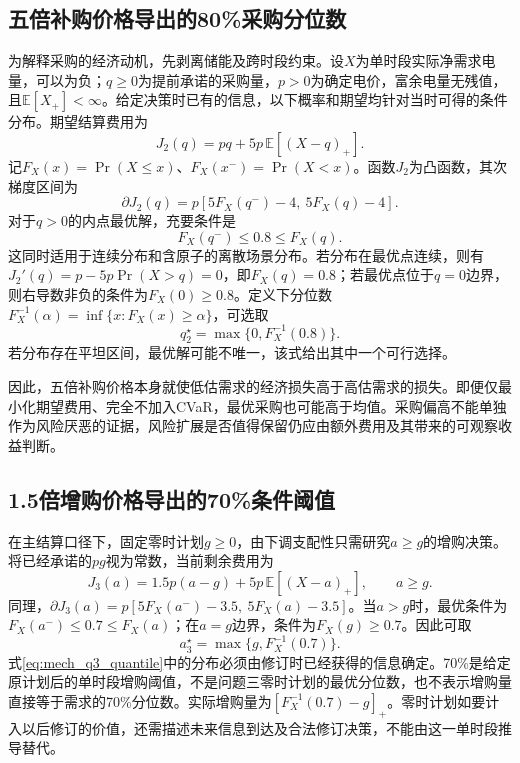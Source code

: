 \subsection{五倍补购价格导出的80\%采购分位数}

为解释采购的经济动机，先剥离储能及跨时段约束。设$X$为单时段实际净需求电量，可以为负；$q\ge0$为提前承诺的采购量，$p>0$为确定电价，富余电量无残值，且$\mathbb E[X_+]<\infty$。给定决策时已有的信息，以下概率和期望均针对当时可得的条件分布。期望结算费用为
\begin{equation}
 J_2(q)=pq+5p\,\mathbb E[(X-q)_+].
 \label{eq:mech_q2_cost}
\end{equation}
记$F_X(x)=\Pr(X\le x)$、$F_X(x^-)=\Pr(X<x)$。函数$J_2$为凸函数，其次梯度区间为
\begin{equation}
 \partial J_2(q)=p[5F_X(q^-)-4,\ 5F_X(q)-4].
 \label{eq:mech_q2_subgradient}
\end{equation}
对于$q>0$的内点最优解，充要条件是
\begin{equation}
 F_X(q^-)\le0.8\le F_X(q).
 \label{eq:mech_q2_quantile_condition}
\end{equation}
这同时适用于连续分布和含原子的离散场景分布。若分布在最优点连续，则有$J_2'(q)=p-5p\Pr(X>q)=0$，即$F_X(q)=0.8$；若最优点位于$q=0$边界，则右导数非负的条件为$F_X(0)\ge0.8$。定义下分位数$F_X^{-1}(\alpha)=\inf\{x:F_X(x)\ge\alpha\}$，可选取
\begin{equation}
 q_2^\star=\max\{0,F_X^{-1}(0.8)\}.
 \label{eq:mech_q2_quantile}
\end{equation}
若分布存在平坦区间，最优解可能不唯一，该式给出其中一个可行选择。

因此，五倍补购价格本身就使低估需求的经济损失高于高估需求的损失。即便仅最小化期望费用、完全不加入CVaR，最优采购也可能高于均值。采购偏高不能单独作为风险厌恶的证据，风险扩展是否值得保留仍应由额外费用及其带来的可观察收益判断。

\subsection{1.5倍增购价格导出的70\%条件阈值}

在主结算口径下，固定零时计划$g\ge0$，由下调支配性只需研究$a\ge g$的增购决策。将已经承诺的$pg$视为常数，当前剩余费用为
\begin{equation}
 J_3(a)=1.5p(a-g)+5p\,\mathbb E[(X-a)_+],\qquad a\ge g.
 \label{eq:mech_q3_cost}
\end{equation}
同理，$\partial J_3(a)=p[5F_X(a^-)-3.5,\ 5F_X(a)-3.5]$。当$a>g$时，最优条件为$F_X(a^-)\le0.7\le F_X(a)$；在$a=g$边界，条件为$F_X(g)\ge0.7$。因此可取
\begin{equation}
 a_3^\star=\max\{g,F_X^{-1}(0.7)\}.
 \label{eq:mech_q3_quantile}
\end{equation}
式\eqref{eq:mech_q3_quantile}中的分布必须由修订时已经获得的信息确定。70\%是给定原计划后的单时段增购阈值，不是问题三零时计划的最优分位数，也不表示增购量直接等于需求的70\%分位数。实际增购量为$[F_X^{-1}(0.7)-g]_+$。零时计划如要计入以后修订的价值，还需描述未来信息到达及合法修订决策，不能由这一单时段推导替代。

